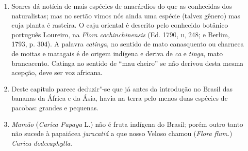\begin{enumerate}
A outra casta, a que chamam \textit{ayo}, que é da feição de uma bolota, e do seu tamanho, a 
qual se faz vermelha como é madura, e sempre é muito doce, a qual se faz também em 
conserva em açúcar e se faz árvore grande, que em todo o ano dá fruto. 

Não é bem que se faça pouca conta da pimenta do Brasil, porque é muito boa e não 
tem outro mal que queimar mais que a da índia, e quem muito a tem em costume folga mais 
com ela, e acha"-lhe mais gostoso que à da Índia, da qual por esse respeito se gasta pouca no 
Brasil, onde os franceses vão buscar a natural da terra, porque da casca vermelha se 
aproveitam nas tintas da mesma cor, e se quando vão resgatar a essa costa acha"-se muita dela, 
estimá"-la"-iam muito mais que o pau"-brasil; e das sementes de dentro se aproveitam 
pisando"-as bem e lançando por cima das pimentas da Índia, com o que a refinam e abatem; 
ainda que se faz este benefício a esta pimenta, poderá entrar na Espanha muita soma, se Sua 
Majestade der a licença para isso; de tal massa é esta terra da Bahia, que se lhe lançarem a 
semente do cravo o dará, como noz"-moscada, que tem o sabor dela, e dá outras árvores que 
dão canela; se for à terra quem a saiba beneficiar será como a de Ceilão, de que se dirá 
adiante.''

\item  Soares dá notícia de mais espécies de anacárdios do que as conhecidas dos 
naturalistas; mas no sertão vimos nós ainda uma espécie (talvez gênero) mas cuja planta é 
rasteira. O caju oriental é descrito pelo conhecido botânico português Loureiro, na 
\textit{Flora cochinchinensis} (Ed. 1790, \textsc{ii}, 248; e Berlim, 1793, p. 304).
A palavra \textit{catinga}, no sentido de mato canasquento ou charneca de moitas e matagais é 
de origem indígena e deriva de \textit{ca} e \textit{tinga}, mato brancacento. Catinga no sentido de ``mau 
cheiro'' se não derivou desta mesma acepção, deve ser voz africana.

\item Deste capítulo 
parece deduzir"-se que já antes da introdução no Brasil das bananas 
da África e da Ásia, havia na terra pelo menos duas espécies de pacobas: grandes e 
pequenas.

\item \textit{Mamão} (\textit{Carica Papaya} L.) não é fruta indígena do Brasil; porém outro tanto não 
sucede à papaiácea \textit{jaracatiá} a que nosso Veloso chamou (\textit{Flora flum.}) \textit{Carica dodecaphylla}.


\end{enumerate}

